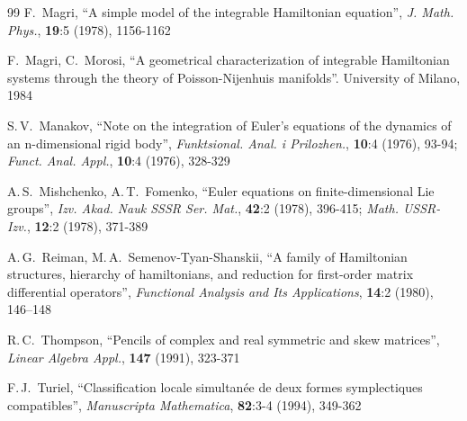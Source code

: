 \documentclass[12pt]{article}
\theoremstyle{definition}
\begin{document}
\begin{thebibliography}{99}
 F.~Magri, ``A simple model of the integrable Hamiltonian equation'', \textit{J. Math. Phys.}, \textbf{19}:5 (1978), 1156-1162


 F.~Magri, C.~Morosi, ``A geometrical characterization of integrable Hamiltonian systems through the theory of Poisson-Nijenhuis manifolds''. University of Milano, 1984


 S.\,V.~Manakov, ``Note on the integration of Euler's equations of the dynamics of an n-dimensional rigid body'', \textit{Funktsional. Anal. i Prilozhen.}, \textbf{10}:4 (1976), 93-94; \textit{Funct. Anal. Appl.}, \textbf{10}:4 (1976), 328-329


 A.\,S.~Mishchenko, A.\,T.~Fomenko, ``Euler equations on finite-dimensional Lie groups'',  \textit{Izv. Akad. Nauk SSSR Ser. Mat.}, \textbf{42}:2 (1978), 396-415; \textit{Math. USSR-Izv.}, \textbf{12}:2 (1978), 371-389


 A.\,G.~Reiman, M.\,A.~Semenov-Tyan-Shanskii, ``A family of Hamiltonian structures, hierarchy of hamiltonians, and reduction for first-order matrix differential operators'', \textit{Functional Analysis and Its Applications}, \textbf{14}:2 (1980), 146–148



 R.\,C.~Thompson, ``Pencils of complex and real symmetric and skew matrices'', \textit{Linear Algebra Appl.}, \textbf{147} (1991), 323-371 
 

F.\,J.~Turiel,  ``Classification locale simultan\'ee de deux formes symplectiques compatibles'', \textit{Manuscripta Mathematica}, \textbf{82}:3-4 (1994), 349-362


\end{thebibliography}
\end{document}
